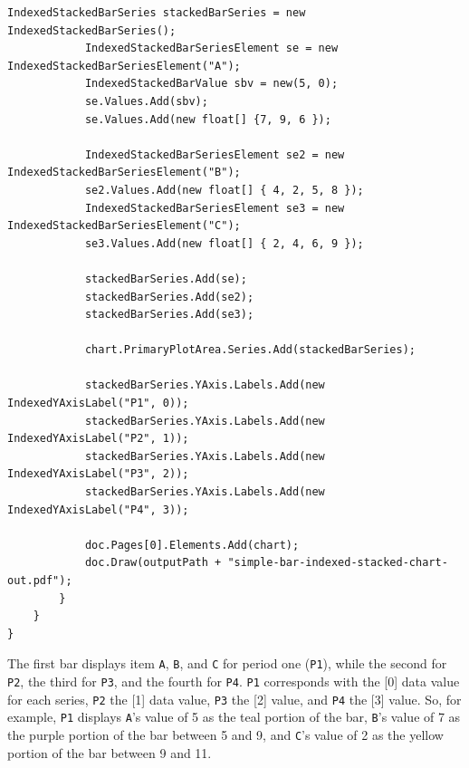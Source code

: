 \documentclass[american]{tufte-book}
\numberwithin{equation}{section}
\numberwithin{figure}{section}
\begin{document}
{\begin{lstlisting}[caption={Stacked bar chart with indexed data example.},label={lis:Stacked-bar-chart},basicstyle={\footnotesize\ttfamily},breaklines=true]
            IndexedStackedBarSeries stackedBarSeries = new IndexedStackedBarSeries();
            IndexedStackedBarSeriesElement se = new IndexedStackedBarSeriesElement("A");
            IndexedStackedBarValue sbv = new(5, 0);
            se.Values.Add(sbv);
            se.Values.Add(new float[] {7, 9, 6 });

            IndexedStackedBarSeriesElement se2 = new IndexedStackedBarSeriesElement("B");
            se2.Values.Add(new float[] { 4, 2, 5, 8 });
            IndexedStackedBarSeriesElement se3 = new IndexedStackedBarSeriesElement("C");
            se3.Values.Add(new float[] { 2, 4, 6, 9 });

            stackedBarSeries.Add(se);
            stackedBarSeries.Add(se2);
            stackedBarSeries.Add(se3);

            chart.PrimaryPlotArea.Series.Add(stackedBarSeries);

            stackedBarSeries.YAxis.Labels.Add(new IndexedYAxisLabel("P1", 0));
            stackedBarSeries.YAxis.Labels.Add(new IndexedYAxisLabel("P2", 1));
            stackedBarSeries.YAxis.Labels.Add(new IndexedYAxisLabel("P3", 2));
            stackedBarSeries.YAxis.Labels.Add(new IndexedYAxisLabel("P4", 3));
            
            doc.Pages[0].Elements.Add(chart);
            doc.Draw(outputPath + "simple-bar-indexed-stacked-chart-out.pdf");
        }
    }
}
\end{lstlisting}
\leavevmode\egroup

The first bar displays item \texttt{A}, \texttt{B}, and \texttt{C}
for period one (\texttt{P1}), while the second for \texttt{P2}, the
third for \texttt{P3}, and the fourth for \texttt{P4}. \texttt{P1}
corresponds with the {[}0{]} data value for each series, \texttt{P2}
the {[}1{]} data value, \texttt{P3} the {[}2{]} value, and \texttt{P4}
the {[}3{]} value. So, for example, \texttt{P1} displays \texttt{A}'s
value of 5 as the teal portion of the bar, \texttt{B}'s value of 7
as the purple portion of the bar between 5 and 9, and \texttt{C}'s
value of 2 as the yellow portion of the bar between 9 and 11.

}
\end{document}
